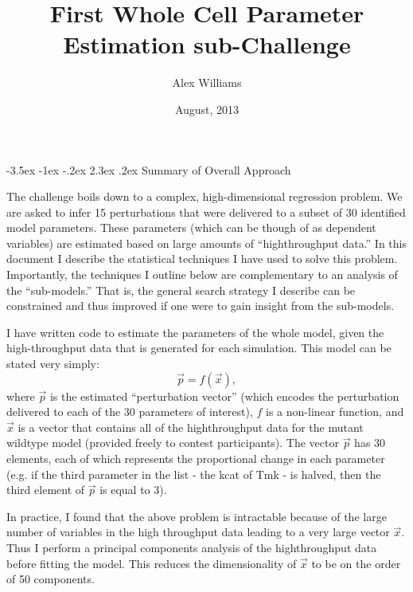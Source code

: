 \documentclass[12pt]{article}
\title{First Whole Cell Parameter Estimation sub-Challenge}  %
\author{Alex  Williams}                          %
\date{August, 2013}                              %
\begin{document}
\makeatletter
\renewcommand\section{\@startsection{section}{1}{\z@}%
                   {-3.5ex \@plus -1ex \@minus -.2ex}%
                                   {2.3ex \@plus.2ex}%
                         {\normalfont\small\bfseries}}
\makeatother
\maketitle                                              %

\section{Summary of Overall Approach}

The challenge boils down to a complex, high-dimensional regression problem.
We are asked to infer 15 perturbations that were delivered to a subset of 30
identified model parameters. These parameters (which can be though of as
dependent variables) are estimated based on large amounts of ``highthroughput
data.'' In this document I describe the statistical techniques I have used to
solve this problem. Importantly, the techniques I outline below are complementary to an
analysis of the ``sub-models.'' That is, the general search strategy I describe can be constrained
and thus improved if one were to gain insight from the sub-models.

I have written code to estimate the parameters of the whole model, given
the high-throughput data that is generated for each simulation. This model can be
stated very simply:
$$\vec{p} = f(\vec{x}),$$
where $\vec{p}$ is the estimated ``perturbation vector'' (which encodes the perturbation
delivered to each of the 30 parameters of interest), $f$ is a non-linear function, and
$\vec{x}$ is a vector that contains all of the highthroughput data for the mutant wildtype
model (provided freely to contest participants). The vector $\vec{p}$ has 30 elements, each
of which represents the proportional change in each parameter (e.g. if the third parameter
in the list - the kcat of Tmk - is halved, then the third element of $\vec{p}$ is equal to 3).

In practice, I found that the above problem is intractable because of the large number of
variables in the high throughput data leading to a very large vector $\vec{x}$. Thus I perform
a principal components analysis of the highthroughput data before fitting the model. This reduces
the dimensionality of $\vec{x}$ to be on the order of 50 components.
\end{document}
